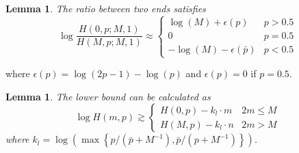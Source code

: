 \documentclass{article}
\newcounter{lemmas}
\newtheorem{lemma}[lemmas]{Lemma}
\begin{document}
\begin{lemma}
\label{Ratio1}
The ratio between two ends satisfies
$$\log\frac{H(0,p;M,1)}{H(M,p;M,1)} \approx \left\{
    \begin{array}{cl}
    \log(M)+\epsilon(p) & p>0.5\\
    0 & p=0.5\\
    -\log(M)-\epsilon(\bar{p}) & p<0.5
    \end{array}\right.$$
\end{lemma}
where $\epsilon(p)=\log(2p-1)-\log(p)$ and $\epsilon(p)=0$ if $p=0.5$.
\begin{lemma}
\label{LowBound1}
The lower bound can be calculated as
\begin{equation*}
\log H(m,p)\gtrsim \left\{
    \begin{array}{cl}
    H(0,p)- k_l \cdot m& 2m\leq M\\
    H(M,p)- k_l \cdot n& 2m>M
    \end{array}\right.
\end{equation*}
where $k_l=\log\left(\max\left\{p/(\bar{p}+M^{-1}),\bar{p}/(p+M^{-1})\right\}\right)$.
\end{lemma}
\end{document}
